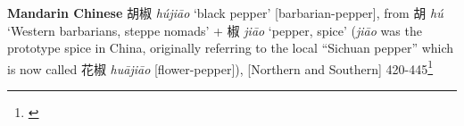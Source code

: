 \begin{etymology}\label{ety:hujiao}
\textbf{Mandarin Chinese} {胡椒} \textit{hú​jiāo} `black pepper' [barbarian-pepper], from 胡 \textit{hú​} `Western barbarians, steppe nomads' + 椒 \textit{jiāo} `pepper, spice' (\textit{jiāo} was the prototype spice in China, originally referring to the local ``Sichuan pepper'' which is now called 花椒 \textit{huājiāo} [flower-pepper]), [Northern and Southern] 420-445\footnote{\textcite{schuessler_abc_2007}}
\end{etymology}
